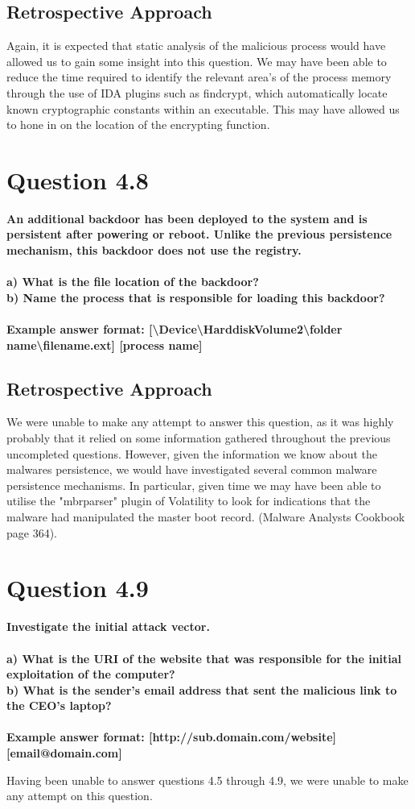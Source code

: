 \subsection{Retrospective Approach}
Again, it is expected that static analysis of the malicious process would have allowed us to gain some insight into this question. We may have been able to reduce the time required to identify the relevant area's of the process memory through the use of IDA plugins such as findcrypt, which automatically locate known cryptographic constants within an executable. This may have allowed us to hone in on the location of the encrypting function. 
\section{Question 4.8}
\textbf{An additional backdoor has been deployed to the system and is persistent
after powering or reboot. Unlike the previous persistence mechanism, this
backdoor does not use the registry.
\\
\\a) What is the file location of the backdoor?
\\b) Name the process that is responsible for loading this backdoor?
\\\\
Example answer format:
[\textbackslash{}Device\textbackslash{}HarddiskVolume2\textbackslash{}folder
name\textbackslash{}filename.ext] [process name]}
\subsection{Retrospective Approach}
We were unable to make any attempt to answer this question, as it was highly probably that it relied on some information gathered throughout the previous uncompleted questions. However, given the information we know about the malwares persistence, we would have investigated several common malware persistence mechanisms. In particular, given time we may have been able to utilise the "mbrparser" plugin of Volatility to look for indications that the malware had manipulated the master boot record. (Malware Analysts Cookbook page 364).

\section{Question 4.9}
\textbf{Investigate the initial attack vector.
\\
\\a) What is the URI of the website that was responsible for the initial
exploitation of the computer?
\\b) What is the sender's email address that sent the malicious link to the
CEO's laptop?
\\\\
Example answer format: [http://sub.domain.com/website] [email@domain.com]}

Having been unable to answer questions 4.5 through 4.9, we were unable to make any attempt on this question.
